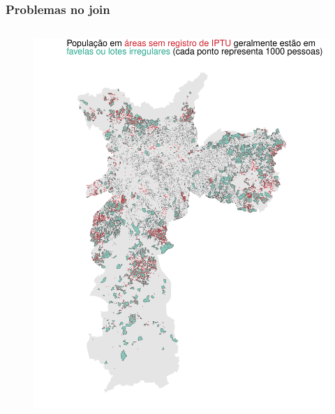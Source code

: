 \documentclass[%
    9pt, 
    aspectratio=169,
]{beamer}
\begin{document}
\begin{frame}
    \frametitle{Problemas no join}

    \begin{columns}[T]
        \begin{figure}
            \centering
            \includegraphics[width = 1\linewidth]{imagens/mapa_pontos.pdf}
        \end{figure}


\end{columns}
\end{frame}
\end{document}
